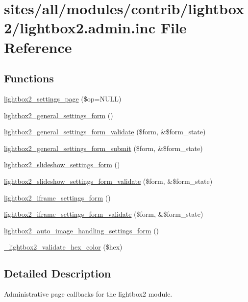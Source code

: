 \hypertarget{lightbox2_8admin_8inc}{
\section{sites/all/modules/contrib/lightbox2/lightbox2.admin.inc File Reference}
\label{lightbox2_8admin_8inc}
}
\subsection*{Functions}
\begin{CompactItemize}
\item 
\hyperlink{lightbox2_8admin_8inc_a8d608663e0a4cb36fbecf86120cde98}{lightbox2\_\-settings\_\-page} (\$op=NULL)
\item 
\hyperlink{lightbox2_8admin_8inc_576fc0399477384e717cdb02268e07d1}{lightbox2\_\-general\_\-settings\_\-form} ()
\item 
\hyperlink{lightbox2_8admin_8inc_05ca8e985693d1555059fff473a6c5fe}{lightbox2\_\-general\_\-settings\_\-form\_\-validate} (\$form, \&\$form\_\-state)
\item 
\hyperlink{lightbox2_8admin_8inc_a58d07e2b25cde85683aff03ed5fa405}{lightbox2\_\-general\_\-settings\_\-form\_\-submit} (\$form, \&\$form\_\-state)
\item 
\hyperlink{lightbox2_8admin_8inc_1e5726ae1be5d069af4e20160109f43b}{lightbox2\_\-slideshow\_\-settings\_\-form} ()
\item 
\hyperlink{lightbox2_8admin_8inc_5eebf8f7195be0d686e6b4831f35cd1c}{lightbox2\_\-slideshow\_\-settings\_\-form\_\-validate} (\$form, \&\$form\_\-state)
\item 
\hyperlink{lightbox2_8admin_8inc_a5ab39b865daa5496b0cd9340353fdc5}{lightbox2\_\-iframe\_\-settings\_\-form} ()
\item 
\hyperlink{lightbox2_8admin_8inc_fd229c41efdfdb2353545b7c5f61df33}{lightbox2\_\-iframe\_\-settings\_\-form\_\-validate} (\$form, \&\$form\_\-state)
\item 
\hyperlink{lightbox2_8admin_8inc_bec3ac922e7554bec015bbeb4d9349f1}{lightbox2\_\-auto\_\-image\_\-handling\_\-settings\_\-form} ()
\item 
\hyperlink{lightbox2_8admin_8inc_22924efdd55f341a735a78f54483a8b2}{\_\-lightbox2\_\-validate\_\-hex\_\-color} (\$hex)
\end{CompactItemize}


\subsection{Detailed Description}
Administrative page callbacks for the lightbox2 module. 

